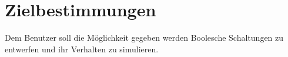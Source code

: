 \section{Zielbestimmungen}


Dem Benutzer soll die Möglichkeit gegeben werden Boolesche Schaltungen zu entwerfen und ihr Verhalten zu simulieren.